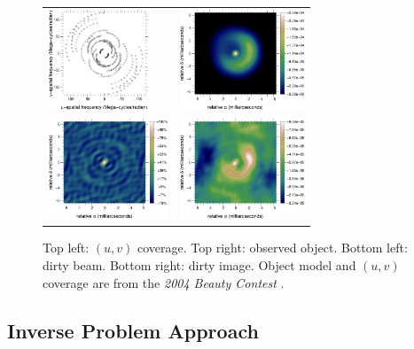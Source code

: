 \documentclass{article}
\newcommand{\uv}{$(u,v)$\xspace}
\begin{document}
\begin{figure}[!t]
  \centering
  \begin{tabular}{lr}
  \includegraphics[height=30mm]{fig2a} &
  \includegraphics[height=30mm]{fig2b} \\[2mm]
  \includegraphics[height=30mm]{fig2c} &
  \includegraphics[height=30mm]{fig2d}\\
  \end{tabular}
  \caption{Top left: \uv coverage. Top right: observed object.  Bottom left:
    dirty beam.  Bottom right: dirty image.  Object model and \uv coverage are
    from the \emph{2004 Beauty Contest}
    \citep{beauty_contest-2004}.}
  \label{fig:dirty-map}
\end{figure}



\subsection{Inverse Problem Approach}
\label{sec:inverse-approach}
\end{document}
